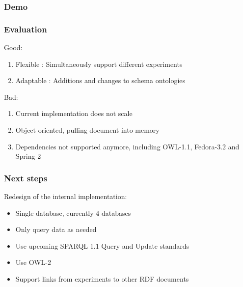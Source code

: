 \documentclass[12pt]{beamer}
\begin{document}
\bgroup
{}
\begin{frame}[plain]{}
\end{frame}
\egroup

\begin{frame}
\frametitle{Demo} 

\end{frame}

\begin{frame}
\frametitle{Evaluation}

Good:

\begin{enumerate}
 \item Flexible : Simultaneously support different experiments
 \item Adaptable : Additions and changes to schema ontologies
\end{enumerate}

Bad:

\begin{enumerate}
 \item Current implementation does not scale
 \item Object oriented, pulling document into memory
 \item Dependencies not supported anymore, including OWL-1.1, Fedora-3.2 and Spring-2
\end{enumerate}


\end{frame}

\begin{frame}
\frametitle{Next steps}

Redesign of the internal implementation:

\begin{itemize}
 \item Single database, currently 4 databases
 \item Only query data as needed
 \item Use upcoming SPARQL 1.1 Query and Update standards
 \item Use OWL-2
 \item Support links from experiments to other RDF documents
\end{itemize}


\end{frame}
\end{document}
